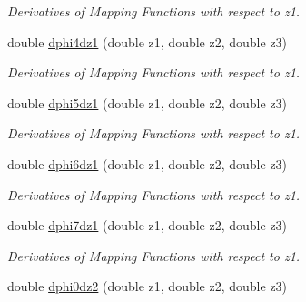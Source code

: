 \begin{DoxyCompactItemize}
\begin{DoxyCompactList}\small\item\em Derivatives of Mapping Functions with respect to z1. \item\end{DoxyCompactList}\item 
\hypertarget{classfemfunctions_a0f665e5ff7c4a34c892d0b46cce8e1f6}{
double \hyperlink{classfemfunctions_a0f665e5ff7c4a34c892d0b46cce8e1f6}{dphi4dz1} (double z1, double z2, double z3)}
\label{classfemfunctions_a0f665e5ff7c4a34c892d0b46cce8e1f6}

\begin{DoxyCompactList}\small\item\em Derivatives of Mapping Functions with respect to z1. \item\end{DoxyCompactList}\item 
\hypertarget{classfemfunctions_a20ff06244cc4c3e870ff4f61b382f26e}{
double \hyperlink{classfemfunctions_a20ff06244cc4c3e870ff4f61b382f26e}{dphi5dz1} (double z1, double z2, double z3)}
\label{classfemfunctions_a20ff06244cc4c3e870ff4f61b382f26e}

\begin{DoxyCompactList}\small\item\em Derivatives of Mapping Functions with respect to z1. \item\end{DoxyCompactList}\item 
\hypertarget{classfemfunctions_aee1572906952bb49585ef43bc956f281}{
double \hyperlink{classfemfunctions_aee1572906952bb49585ef43bc956f281}{dphi6dz1} (double z1, double z2, double z3)}
\label{classfemfunctions_aee1572906952bb49585ef43bc956f281}

\begin{DoxyCompactList}\small\item\em Derivatives of Mapping Functions with respect to z1. \item\end{DoxyCompactList}\item 
\hypertarget{classfemfunctions_a01d37c43146906236c1ce01c1cd96080}{
double \hyperlink{classfemfunctions_a01d37c43146906236c1ce01c1cd96080}{dphi7dz1} (double z1, double z2, double z3)}
\label{classfemfunctions_a01d37c43146906236c1ce01c1cd96080}

\begin{DoxyCompactList}\small\item\em Derivatives of Mapping Functions with respect to z1. \item\end{DoxyCompactList}\item 
\hypertarget{classfemfunctions_aaa397324ef83de866517ed83ce91f074}{
double \hyperlink{classfemfunctions_aaa397324ef83de866517ed83ce91f074}{dphi0dz2} (double z1, double z2, double z3)}
\label{classfemfunctions_aaa397324ef83de866517ed83ce91f074}


\end{DoxyCompactItemize}
